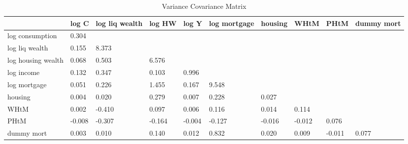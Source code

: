 \begin{table}[htbp]
\caption{\label{clabel} Variance Covariance Matrix}\centering\medskip
\begin{tabular}{llllllllll} \hline \hline
 & log C  & log liq wealth  & log HW  & log Y  & log mortgage  & housing  & WHtM  & PHtM  & dummy mort  \\  \hline 
log consumption &     0.304 \\  
log liq wealth &     0.155 &     8.373 \\  
log housing wealth &     0.068 &     0.503 &     6.576 \\  
log income &     0.132 &     0.347 &     0.103 &     0.996 \\  
log mortgage &     0.051 &     0.226 &     1.455 &     0.167 &     9.548 \\  
housing &     0.004 &     0.020 &     0.279 &     0.007 &     0.228 &     0.027 \\  
WHtM &     0.002 &    -0.410 &     0.097 &     0.006 &     0.116 &     0.014 &     0.114 \\  
PHtM &    -0.008 &    -0.307 &    -0.164 &    -0.004 &    -0.127 &    -0.016 &    -0.012 &     0.076 \\  
dummy mort &     0.003 &     0.010 &     0.140 &     0.012 &     0.832 &     0.020 &     0.009 &    -0.011 &     0.077 \\  
\hline \hline \end{tabular}
\end{table}
